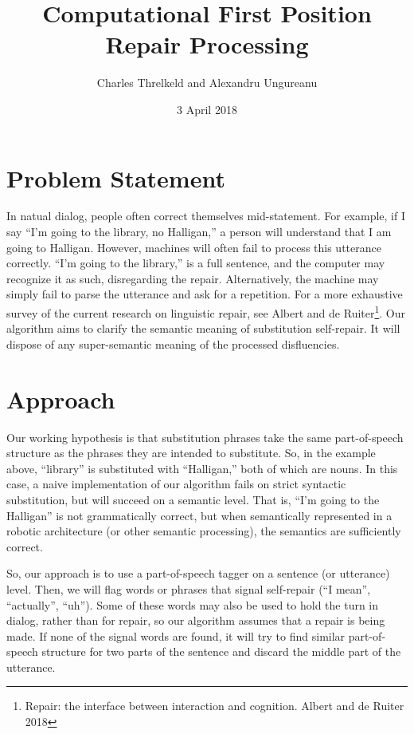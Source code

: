 \documentclass{article}
\title{Computational First Position Repair Processing}
\author{Charles Threlkeld and Alexandru Ungureanu}
\date{3 April 2018}
\begin{document}
\maketitle

\section{Problem Statement}
In natual dialog, people often correct themselves mid-statement. For example, if I say ``I'm going to the library, no Halligan,'' a person will understand that I am going to Halligan. However, machines will often fail to process this utterance correctly. ``I'm going to the library,'' is a full sentence, and the computer may recognize it as such, disregarding the repair. Alternatively, the machine may simply fail to parse the utterance and ask for a repetition. For a more exhaustive survey of the current research on linguistic repair, see Albert and de Ruiter\footnote{Repair: the interface between interaction and cognition. Albert and de Ruiter 2018}. Our algorithm aims to clarify the semantic meaning of substitution self-repair. It will dispose of any super-semantic meaning of the processed disfluencies.

\section{Approach}

Our working hypothesis is that substitution phrases take the same part-of-speech structure as the phrases they are intended to substitute. So, in the example above, ``library'' is substituted with ``Halligan,'' both of which are nouns. In this case, a naive implementation of our algorithm fails on strict syntactic substitution, but will succeed on a semantic level. That is, ``I'm going to the Halligan'' is not grammatically correct, but when semantically represented in a robotic architecture (or other semantic processing), the semantics are sufficiently correct.

So, our approach is to use a part-of-speech tagger on a sentence (or utterance) level. Then, we will flag words or phrases that signal self-repair (``I mean'', ``actually'', ``uh''). Some of these words may also be used to hold the turn in dialog, rather than for repair, so our algorithm assumes that a repair is being made. If none of the signal words are found, it will try to find similar part-of-speech structure for two parts of the sentence and discard the middle part of the utterance.
\end{document}
